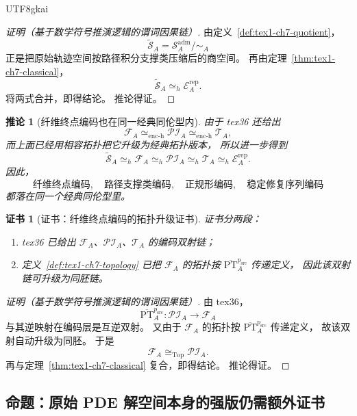 \documentclass[12pt]{article}
\newtheorem{corollary}{推论}[section]
\newtheorem{Certificate}{证书}[section]
\begin{document}
\begin{CJK*}{UTF8}{gkai}
\begin{proof}[证明（基于数学符号推演逻辑的谓词因果链）]
由定义~\ref{def:tex1-ch7-quotient}，
\[
  \widetilde{\mathcal S}_A
  =
  \mathcal S_A^{\mathrm{adm}}/\sim_A
\]
正是把原始轨迹空间按路径积分支撑类压缩后的商空间。
再由定理~\ref{thm:tex1-ch7-classical}，
\[
  \widetilde{\mathcal S}_A
  \simeq_h
  \mathcal E_A^{\mathrm{rep}}.
\]
将两式合并，即得结论。
推论得证。
\end{proof}

\begin{corollary}[纤维终点编码也在同一经典同伦型内]
\label{cor:tex1-ch7-fiber}
由于 tex36 还给出
\[
  \mathcal F_A\simeq_{\mathrm{enc\text{-}h}}\mathcal{PI}_A
  \simeq_{\mathrm{enc\text{-}h}}\mathcal T_A,
\]
而上面已经用相容拓扑把它升级为经典拓扑版本，
所以进一步得到
\[
  \widetilde{\mathcal S}_A
  \simeq_h
  \mathcal F_A
  \simeq_h
  \mathcal{PI}_A
  \simeq_h
  \mathcal T_A
  \simeq_h
  \mathcal E_A^{\mathrm{rep}}.
\]
因此，
\[
  \text{纤维终点编码},\quad
  \text{路径支撑类编码},\quad
  \text{正规形编码},\quad
  \text{稳定修复序列编码}
\]
都落在同一个经典同伦型里。
\end{corollary}

\begin{Certificate}[证书：纤维终点编码的拓扑升级证书]
\label{cert:tex1-ch7-fiber}
证书分两段：
\begin{enumerate}
  \item tex36 已给出 \(\mathcal F_A\)、\(\mathcal{PI}_A\)、\(\mathcal T_A\) 的编码双射链；
  \item 定义~\ref{def:tex1-ch7-topology} 已把 \(\mathcal F_A\) 的拓扑按 \(\overline{\mathrm{PT}}_A^{p_{\mathrm{src}}}\) 传递定义，
    因此该双射链可升级为同胚链。
\end{enumerate}
\end{Certificate}

\begin{proof}[证明（基于数学符号推演逻辑的谓词因果链）]
由 tex36，
\[
  \overline{\mathrm{PT}}_A^{p_{\mathrm{src}}}:\mathcal{PI}_A\to \mathcal F_A
\]
与其逆映射在编码层是互逆双射。
又由于 \(\mathcal F_A\) 的拓扑按 \(\overline{\mathrm{PT}}_A^{p_{\mathrm{src}}}\) 传递定义，
故该双射自动升级为同胚。
于是
\[
  \mathcal F_A\cong_{\mathrm{Top}}\mathcal{PI}_A.
\]
再与定理~\ref{thm:tex1-ch7-classical} 复合，即得结论。
推论得证。
\end{proof}

\subsection{命题：原始 PDE 解空间本身的强版仍需额外证书}
\label{subsec:tex1-ch7-proposition}


\end{CJK*}
\end{document}

